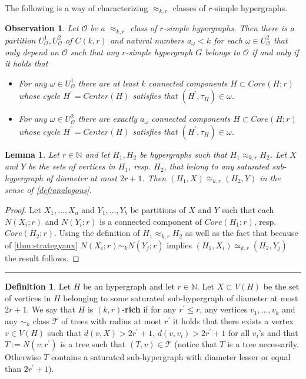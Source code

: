 \documentclass[12pt,notitlepage,a4paper]{article}
\newtheorem{obs}{Observation}[section]
\newtheorem{lemma}{Lemma}[section]
\theoremstyle{definition}
\newtheorem{definition}{Definition}[section]
\newcommand{\N}{\mathbb{N}}
\newcommand{\sep}{\noindent\rule{2cm}{0.4pt}}
\begin{document}
The following is a way of characterizing $\approx_{k,r}$ classes
of $r$-simple hypergraphs.


\begin{obs}\label{obs:agreeablecores}
	Let $\mathcal{O}$ be a $\approx_{k,r}$ class
	of $r$-simple hypergraphs. 
	Then there is a partition $U^1_\mathcal{O},
	U^2_\mathcal{O}$ of $C(k,r)$ and natural numbers $a_\omega<k$
	for each $\omega\in U^2_\mathcal{O}$ that only depend on 
	$\mathcal{O}$ such that any $r$-simple hypergraph $G$ belongs to
	$\mathcal{O}$ if and only if it holds that
	\begin{itemize}
		\item[(1)] For any $\omega\in U^1_\mathcal{O}$ there are at least
		$k$ connected components $H \subset Core(H;r)$ whose cycle 		
		$H^\prime=Center(H)$ satisfies that
		$(H^{\prime},\tau_{H})\in \omega$.
		\item[(2)]For any $\omega\in U^2_\mathcal{O}$ there are exactly 
		$a_\omega$ connected components $H \subset Core(H;r)$ whose cycle 		
		$H^\prime=Center(H)$ satisfies that
		$(H^{\prime},\tau_{H})\in \omega$.	
	\end{itemize}
\end{obs}


\begin{lemma} \label{lem:aux1}
	Let $r\in \N$ and let $H_1, H_2$ be hypergraphs such that 
	$H_1\approx_{k,r} H_2$. Let $X$ and $Y$ be the
	sets of vertices in $H_1$, resp. $H_2$, that
	belong to any saturated sub-hypergraph of diameter 
	at most $2r+1$. Then $(H_1,X)\cong_{k,r} (H_2,Y)$ in the sense of
	\cref{def:analogous}.
\end{lemma}
\begin{proof}
	Let $X_1,\dots, X_a$ and $Y_1,\dots, Y_b$ be partitions of
	$X$ and $Y$ such that each $N(X_i;r)$ and $N(Y_i;r)$ is 
	a connected component of $Core(H_1;r)$, resp. $Core(H_2;r)$.
	Using the definition of $H_1\approx_{k,r}H_2$ as well 
	as the fact that  because of \cref{thm:strategyaux}
	$N(X_i;r)\sim_k N(Y_j;r)$ implies 
	$(H_1,X_i)\simeq_{k,r} (H_2,Y_j)$
	the result follows.	
\end{proof}
\sep
\begin{definition} \label{def:rich}
	Let $H$ be an hypergraph and let $r\in\N$. Let
	$X\subset V(H)$ be the set of vertices in $H$
	belonging to some saturated sub-hypergraph of diameter
	at most $2r+1$.	We say that $H$ is $(k,r)$-\textbf{rich}
	if for any $r^\prime\leq r$, any vertices $v_1,\dots, v_k$ 
	and any $\sim_k$ class $\mathcal{T}$ of trees with radius
	at most $r^\prime$ it holds that there exists a vertex $v\in V(H)$
	such that $d(v,X)> 2r^\prime+1$, $d(v,v_i)>2r^\prime+1$ for all
	$v_i$'s and that $T:=N(v;r^\prime)$ is a tree such that
	$(T,v)\in \mathcal{T}$ (notice that $T$ is a tree necessarily. 
	Otherwise $T$ contains a saturated sub-hypergraph with diameter 
	lesser or equal than $2r^\prime+1$).	
\end{definition}
\end{document}
